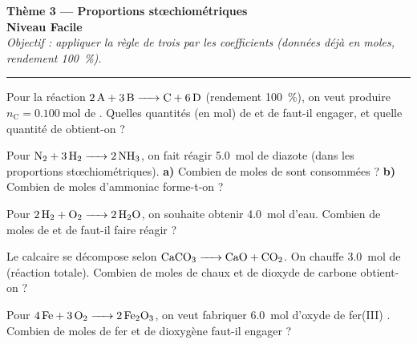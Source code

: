 \documentclass[11pt,a4paper]{article}
\newcommand{\nq}[1]{n_{\text{#1}}}
\begin{document}
\begin{center}
{\LARGE\bfseries\color{primarydark}Thème 3 — Proportions stœchiométriques}\\[1pt]
{\large\color{excol}\textbf{Niveau Facile}}\\[2pt]
{\itshape Objectif : appliquer la règle de trois par les coefficients (données déjà en moles, rendement \SI{100}{\percent}).}\\
{\color{primary}\rule{0.62\linewidth}{1pt}}
\end{center}

\begin{exo}
Pour la réaction $\ce{2 A + 3 B -> C + 6 D}$ (rendement \SI{100}{\percent}), on veut produire
$\nq{C}=\SI{0,100}{\mole}$ de .
Quelles quantités (en mol) de  et de  faut-il engager, et quelle quantité de 
obtient-on ?
\end{exo}

\begin{exo}
Pour $\ce{N2 + 3 H2 -> 2 NH3}$, on fait réagir \SI{5,0}{\mole} de diazote  (dans les
proportions stœchiométriques).
\textbf{a)} Combien de moles de  sont consommées ?\quad
\textbf{b)} Combien de moles d'ammoniac  forme-t-on ?
\end{exo}

\begin{exo}
Pour $\ce{2 H2 + O2 -> 2 H2O}$, on souhaite obtenir \SI{4,0}{\mole} d'eau.
Combien de moles de  et de  faut-il faire réagir ?
\end{exo}

\begin{exo}
Le calcaire se décompose selon $\ce{CaCO3 -> CaO + CO2}$. On chauffe \SI{3,0}{\mole} de 
(réaction totale).
Combien de moles de chaux  et de dioxyde de carbone  obtient-on ?
\end{exo}

\begin{exo}
Pour $\ce{4 Fe + 3 O2 -> 2 Fe2O3}$, on veut fabriquer \SI{6,0}{\mole} d'oxyde de fer(III) .
Combien de moles de fer  et de dioxygène  faut-il engager ?
\end{exo}
\end{document}

